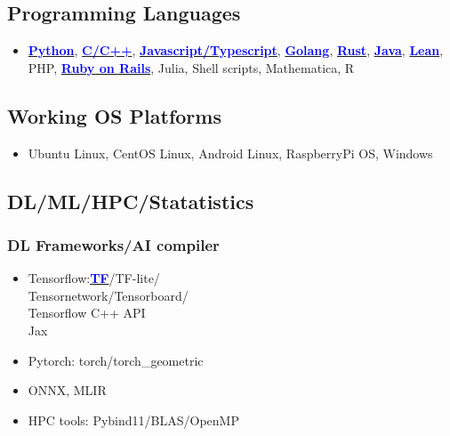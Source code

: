 \documentclass[11pt]{article}
\begin{document}
\begin{multicols*}{2}
\subsection*{Programming Languages}
\begin{itemize}[noitemsep]
    \item \href{https://github.com/Kuo-TingKai/submarine-cable-monitor}{\textbf{\textcolor{blue}{Python}}}, 
    \href{https://github.com/Kuo-TingKai/cpp_linux_chat}{\textbf{\textcolor{blue}{C/C++}}}, 
    \href{https://github.com/Kuo-TingKai/three-3d-game}{\textbf{\textcolor{blue}{Javascript/Typescript}}}, 
    \href{https://github.com/Kuo-TingKai/golang-web3-app}{\textbf{\textcolor{blue}{Golang}}},
    \href{https://github.com/xiph/rav1e/compare/master...Kuo-TingKai:rav1e:master}{\textbf{\textcolor{blue}{Rust}}},
    \href{https://github.com/Kuo-TingKai/java-backend-cloud-maven-app}{\textbf{\textcolor{blue}{Java}}}, 
    \href{https://github.com/Kuo-TingKai/lean4-basic-ag}{\textbf{\textcolor{blue}{Lean}}}, PHP, 
    \href{https://github.com/Kuo-TingKai/RoR-app}{\textbf{\textcolor{blue}{Ruby on Rails}}}, 
    Julia, Shell scripts, Mathematica, R
\end{itemize}

\subsection*{Working OS Platforms}
\begin{itemize}[noitemsep]
    \item Ubuntu Linux, CentOS Linux, Android Linux, RaspberryPi OS, Windows
\end{itemize}

\subsection*{DL/ML/HPC/Statatistics}

\subsubsection*{DL Frameworks/AI compiler}
\begin{itemize}[noitemsep]
    \item Tensorflow:\href{https://github.com/Kuo-TingKai/TNNN}{\textbf{\textcolor{blue}{TF}}}/TF-lite/\\Tensornetwork/Tensorboard/\\Tensorflow C++ API\\
    Jax
    \item Pytorch: torch/torch\_geometric
    \item ONNX, MLIR
    \item HPC tools: Pybind11/BLAS/OpenMP 
\end{itemize}

\end{multicols*}
\end{document}
